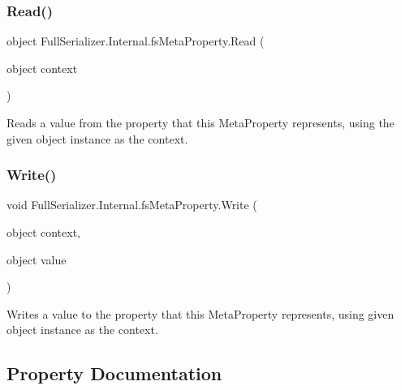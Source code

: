 \subsubsection{\texorpdfstring{Read()}{Read()}}
{\footnotesize\ttfamily object Full\+Serializer.\+Internal.\+fs\+Meta\+Property.\+Read (\begin{DoxyParamCaption}\item[{object}]{context }\end{DoxyParamCaption})\hspace{0.3cm}{\ttfamily [inline]}}



Reads a value from the property that this Meta\+Property represents, using the given object instance as the context. 

\mbox{\label{class_full_serializer_1_1_internal_1_1fs_meta_property_ae201dc2b432cfdb36aa124743a29eb64}} 
\subsubsection{\texorpdfstring{Write()}{Write()}}
{\footnotesize\ttfamily void Full\+Serializer.\+Internal.\+fs\+Meta\+Property.\+Write (\begin{DoxyParamCaption}\item[{object}]{context,  }\item[{object}]{value }\end{DoxyParamCaption})\hspace{0.3cm}{\ttfamily [inline]}}



Writes a value to the property that this Meta\+Property represents, using given object instance as the context. 



\subsection{Property Documentation}
\mbox{\label{class_full_serializer_1_1_internal_1_1fs_meta_property_aaf026b2fbb58e4b707af810ad65c7f22}} 
